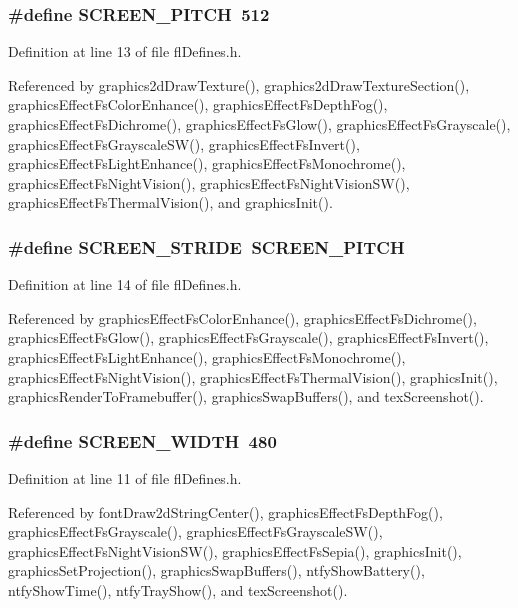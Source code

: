 \subsubsection{\setlength{\rightskip}{0pt plus 5cm}\#define SCREEN\_\-PITCH~512}\label{flDefines_8h_226f7444fc504b827957882b9d0aeb5a}




Definition at line 13 of file fl\-Defines.h.

Referenced by graphics2d\-Draw\-Texture(), graphics2d\-Draw\-Texture\-Section(), graphics\-Effect\-Fs\-Color\-Enhance(), graphics\-Effect\-Fs\-Depth\-Fog(), graphics\-Effect\-Fs\-Dichrome(), graphics\-Effect\-Fs\-Glow(), graphics\-Effect\-Fs\-Grayscale(), graphics\-Effect\-Fs\-Grayscale\-SW(), graphics\-Effect\-Fs\-Invert(), graphics\-Effect\-Fs\-Light\-Enhance(), graphics\-Effect\-Fs\-Monochrome(), graphics\-Effect\-Fs\-Night\-Vision(), graphics\-Effect\-Fs\-Night\-Vision\-SW(), graphics\-Effect\-Fs\-Thermal\-Vision(), and graphics\-Init().
\subsubsection{\setlength{\rightskip}{0pt plus 5cm}\#define SCREEN\_\-STRIDE~SCREEN\_\-PITCH}\label{flDefines_8h_c2d64057e7c0a0c3679fdeeb3141e7ce}




Definition at line 14 of file fl\-Defines.h.

Referenced by graphics\-Effect\-Fs\-Color\-Enhance(), graphics\-Effect\-Fs\-Dichrome(), graphics\-Effect\-Fs\-Glow(), graphics\-Effect\-Fs\-Grayscale(), graphics\-Effect\-Fs\-Invert(), graphics\-Effect\-Fs\-Light\-Enhance(), graphics\-Effect\-Fs\-Monochrome(), graphics\-Effect\-Fs\-Night\-Vision(), graphics\-Effect\-Fs\-Thermal\-Vision(), graphics\-Init(), graphics\-Render\-To\-Framebuffer(), graphics\-Swap\-Buffers(), and tex\-Screenshot().
\subsubsection{\setlength{\rightskip}{0pt plus 5cm}\#define SCREEN\_\-WIDTH~480}\label{flDefines_8h_2cd109632a6dcccaa80b43561b1ab700}




Definition at line 11 of file fl\-Defines.h.

Referenced by font\-Draw2d\-String\-Center(), graphics\-Effect\-Fs\-Depth\-Fog(), graphics\-Effect\-Fs\-Grayscale(), graphics\-Effect\-Fs\-Grayscale\-SW(), graphics\-Effect\-Fs\-Night\-Vision\-SW(), graphics\-Effect\-Fs\-Sepia(), graphics\-Init(), graphics\-Set\-Projection(), graphics\-Swap\-Buffers(), ntfy\-Show\-Battery(), ntfy\-Show\-Time(), ntfy\-Tray\-Show(), and tex\-Screenshot().